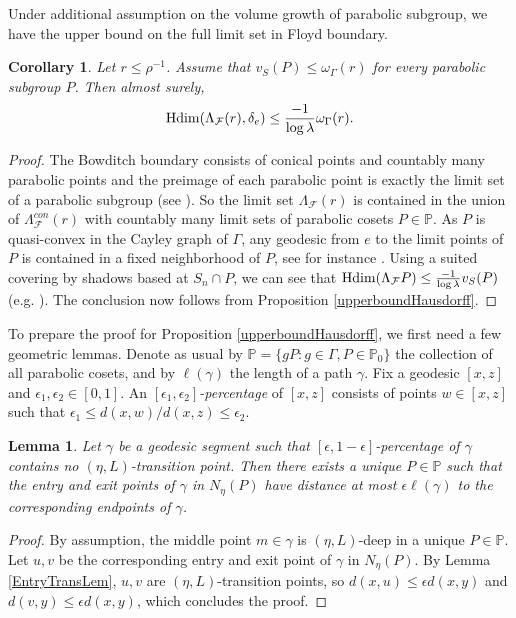 \documentclass{amsart}
\newtheorem{cor}[thm]{Corollary}
\newtheorem{lem}[thm]{Lemma}
\theoremstyle{definition}
\theoremstyle{remark}
\newcommand{\Hdim}{{\rm Hdim}}
\begin{document}
Under additional assumption on the volume growth of parabolic subgroup, we have the upper bound on the full limit set in Floyd boundary.
\begin{cor}\label{corowholeFloyd}
Let $r\leq \rho^{-1}$. Assume that $v_S(P)\le \omega_{\Gamma}(r)$ for every parabolic subgroup $P$. Then
almost surely,  
$$\Hdim(\Lambda_{\mathcal{F}}(r),\delta_e)\leq \frac{-1}{\log \lambda}\omega_{\Gamma}(r).$$
\end{cor}
\begin{proof}
The Bowditch boundary consists of conical points and countably many parabolic points and the preimage of each parabolic point is exactly the limit set of a parabolic subgroup (see \cite[Theorem A]{GePoJEMS}).
So the limit set $\Lambda_{\mathcal{F}}(r)$   is contained in the  union of $\Lambda^{con}_{\mathcal{F}}(r)$ with countably many limit sets of parabolic cosets $P\in\mathbb P$.
As $P$ is quasi-convex  in  the Cayley graph of $\Gamma$, any geodesic from $e$ to the limit points of $P$ is contained in a fixed neighborhood of $P$, see for instance \cite[Lemma~4.3]{DrutuSapir}.
Using a suited covering by shadows based at $S_n\cap P$, we can see that $\Hdim(\Lambda_{\mathcal{F}} P)\le \frac{-1}{\log \lambda}v_S(P)$ (e.g. \cite[Lemma 4.1]{PY}).
The conclusion now follows from Proposition \ref{upperboundHausdorff}.   
\end{proof}

To prepare the proof for Proposition \ref{upperboundHausdorff}, we first need a few geometric lemmas.
Denote as usual by $\mathbb P=\{gP: g\in \Gamma, P\in\mathbb P_0\}$ the collection of all parabolic cosets, and by $\ell(\gamma)$ the length of a path $\gamma$.
Fix a geodesic $[x,z]$ and $\epsilon_1,\epsilon_2\in [0,1]$. An \textit{$[\epsilon_1,\epsilon_2]$-percentage} of $[x,z]$ consists of points $w\in [x,z]$ such that $\epsilon_1 \le d(x,w)/d(x,z)\le \epsilon_2$.


\begin{lem}\label{DeepContainedLem}
Let $\gamma$ be a geodesic segment such that $[\epsilon, 1-\epsilon]$-percentage of $\gamma$ contains no $(\eta, L)$-transition point. Then there exists a unique $P\in\mathbb P$  such that the entry and exit points of $\gamma$ in $N_\eta(P)$ have distance at most $\epsilon \ell(\gamma)$ to the corresponding endpoints of $\gamma$.  
\end{lem}
\begin{proof}
By assumption, the middle point  $m\in \gamma$ is $(\eta, L)$-deep in a unique $P\in \mathbb P$. Let $u, v$ be the corresponding entry and exit point of $\gamma$ in $N_\eta(P)$. By Lemma \ref{EntryTransLem}, $u, v$ are $(\eta, L)$-transition points, so $d(x,u)\leq \epsilon d(x,y)$ and $d(v, y)\le \epsilon d(x,y)$, which concludes the proof.   
\end{proof}
\end{document}
